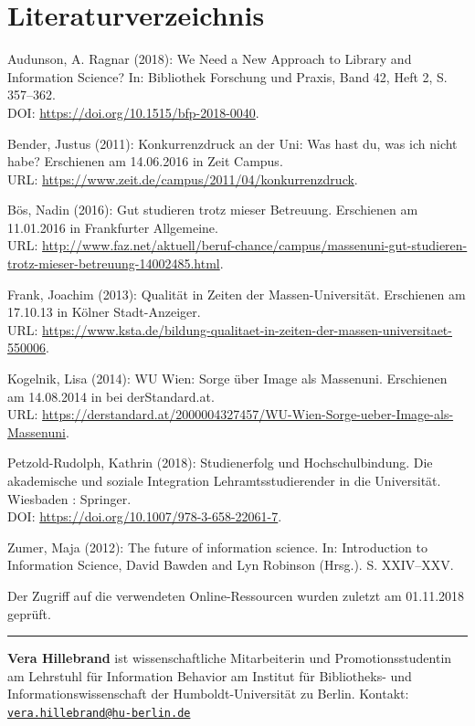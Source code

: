 \documentclass[a4paper,
fontsize=11pt,
oneside,
numbers=noperiodatend,
parskip=half-,
bibliography=totoc,
final
]{scrartcl}
\begin{document}
\hypertarget{literaturverzeichnis}{%
\section{Literaturverzeichnis}\label{literaturverzeichnis}}

Audunson, A. Ragnar (2018): We Need a New Approach to Library and
Information Science? In: Bibliothek Forschung und Praxis, Band 42, Heft
2, S. 357--362.\\
DOI: \url{https://doi.org/10.1515/bfp-2018-0040}.

Bender, Justus (2011): Konkurrenzdruck an der Uni: Was hast du, was ich
nicht habe? Erschienen am 14.06.2016 in Zeit Campus.\\
URL: \url{https://www.zeit.de/campus/2011/04/konkurrenzdruck}.

Bös, Nadin (2016): Gut studieren trotz mieser Betreuung. Erschienen am
11.01.2016 in Frankfurter Allgemeine. \\
URL:
\url{http://www.faz.net/aktuell/beruf-chance/campus/massenuni-gut-studieren-trotz-mieser-betreuung-14002485.html}.

Frank, Joachim (2013): Qualität in Zeiten der Massen-Universität.
Erschienen am 17.10.13 in Kölner Stadt-Anzeiger.\\
URL:
\href{https://www.ksta.de/bildung-qualitaet-in-zeiten-der-massen-universitaet-5500068}{https://www.ksta.de/bildung-qualitaet-in-zeiten-der-massen-universitaet-550006}.

Kogelnik, Lisa (2014): WU Wien: Sorge über Image als Massenuni.
Erschienen am 14.08.2014 in bei derStandard.at.\\
URL:
\url{https://derstandard.at/2000004327457/WU-Wien-Sorge-ueber-Image-als-Massenuni}.

Petzold-Rudolph, Kathrin (2018): Studienerfolg und Hochschulbindung. Die
akademische und soziale Integration Lehramtsstudierender in die
Universität. Wiesbaden : Springer.\\
DOI: \url{https://doi.org/10.1007/978-3-658-22061-7}.

Zumer, Maja (2012): The future of information science. In: Introduction
to Information Science, David Bawden and Lyn Robinson (Hrsg.). S.
XXIV--XXV.

Der Zugriff auf die verwendeten Online-Ressourcen wurden zuletzt am
01.11.2018 geprüft.

\begin{center}\rule{0.5\linewidth}{\linethickness}\end{center}

\textbf{Vera Hillebrand} ist wissenschaftliche Mitarbeiterin und
Promotionsstudentin am Lehrstuhl für Information Behavior am Institut
für Bibliotheks- und Informationswissenschaft der Humboldt-Universität
zu Berlin. Kontakt:
\href{mailto:vera.hillebrand@hu-berlin.de}{\nolinkurl{vera.hillebrand@hu-berlin.de}}
\end{document}
